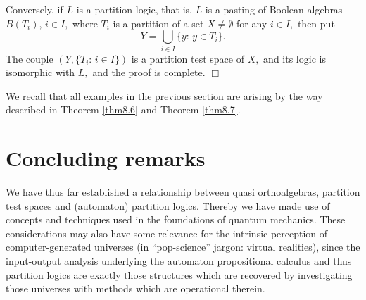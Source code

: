 Conversely, if $L$ is a partition logic, that is, $L$ is a pasting
of Boolean algebras $B(T_i), \,i\in I,$ where $T_i$ is a
partition of a set $X \ne \emptyset$ for any $i \in I,$ then put
\[ Y = \bigcup_{i \in I} \{y :\, y \in T_i\}.\]
The couple $(Y,\{T_i:\, i \in I\})$ is a partition test space of
$X,$ and its logic is isomorphic with $L, $ and the proof is complete.
\hfill $\Box$

We recall that all examples in the previous section are arising
by the way described in Theorem \ref{thm8.6} and Theorem \ref{thm8.7}.


\section{Concluding remarks}

We have thus far established a relationship between quasi orthoalgebras,
partition test spaces and (automaton) partition logics. Thereby we have
made use of concepts and techniques used in the foundations of quantum
mechanics. These considerations may also have some relevance for the
intrinsic perception of computer-generated universes (in ``pop-science''
jargon: virtual realities), since the input-output analysis underlying
the automaton propositional calculus and thus partition logics are
exactly those structures which are recovered by investigating  those
universes with methods which are operational therein.


